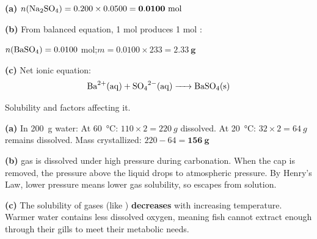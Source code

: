 \documentclass[addpoints]{exam}
\begin{document}
\begin{questions}
\begin{solution}[9cm]
\textbf{(a)} $n(\ce{Na2SO4}) = 0.200 \times 0.0500 = \mathbf{0.0100 \text{ mol}}$

\textbf{(b)} From balanced equation, 1 mol  produces 1 mol :

$n(\ce{BaSO4}) = 0.0100$ mol;\quad $m = 0.0100 \times 233 = \mathbf{\SI{2.33}{g}}$

\textbf{(c)} Net ionic equation:
\[\ce{Ba^{2+}(aq) + SO4^{2-}(aq) -> BaSO4(s)}\]
\end{solution}

\question Solubility and factors affecting it.
\begin{solution}[8cm]
\textbf{(a)} In \SI{200}{g} water:
At \SI{60}{\celsius}: $110 \times 2 = \SI{220}{g}$ dissolved.
At \SI{20}{\celsius}: $32 \times 2 = \SI{64}{g}$ remains dissolved.
Mass crystallized: $220 - 64 = \mathbf{\SI{156}{g}}$

\textbf{(b)}  gas is dissolved under high pressure during carbonation. When the cap
is removed, the pressure above the liquid drops to atmospheric pressure. By Henry's Law,
lower pressure means lower gas solubility, so  escapes from solution.

\textbf{(c)} The solubility of gases (like ) \textbf{decreases} with increasing
temperature. Warmer water contains less dissolved oxygen, meaning fish cannot extract
enough  through their gills to meet their metabolic needs.
\end{solution}

\end{questions}
\end{document}
